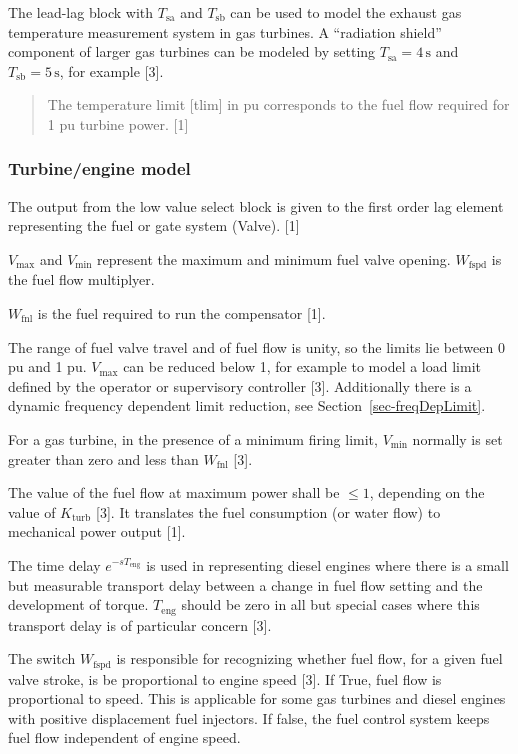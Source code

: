 \documentclass[
  a4paper,
  DIV=11,
  numbers=noendperiod]{scrartcl}
\begin{document}
The lead-lag block with \(T_\mathrm{sa}\) and \(T_\mathrm{sb}\) can be
used to model the exhaust gas temperature measurement system in gas
turbines. A ``radiation shield'' component of larger gas turbines can be
modeled by setting \(T_\mathrm{sa}=4\,\mathrm{s}\) and
\(T_\mathrm{sb}=5\,\mathrm{s}\), for example {[}3{]}.

\begin{quote}
The temperature limit {[}tlim{]} in pu corresponds to the fuel flow
required for 1 pu turbine power. {[}1{]}
\end{quote}

\subsubsection{Turbine/engine model}\label{turbineengine-model}

The output from the low value select block is given to the first order
lag element representing the fuel or gate system (Valve). {[}1{]}

\(V_\mathrm{max}\) and \(V_\mathrm{min}\) represent the maximum and
minimum fuel valve opening. \(W_\mathrm{fspd}\) is the fuel flow
multiplyer.

\(W_\mathrm{fnl}\) is the fuel required to run the compensator {[}1{]}.

The range of fuel valve travel and of fuel flow is unity, so the limits
lie between 0 pu and 1 pu. \(V_\mathrm{max}\) can be reduced below 1,
for example to model a load limit defined by the operator or supervisory
controller {[}3{]}. Additionally there is a dynamic frequency dependent
limit reduction, see Section~\ref{sec-freqDepLimit}.

For a gas turbine, in the presence of a minimum firing limit,
\(V_\mathrm{min}\) normally is set greater than zero and less than
\(W_\mathrm{fnl}\) {[}3{]}.

The value of the fuel flow at maximum power shall be \(\leq 1\),
depending on the value of \(K_\mathrm{turb}\) {[}3{]}. It translates the
fuel consumption (or water flow) to mechanical power output {[}1{]}.

The time delay \(e^{-sT_\mathrm{eng}}\) is used in representing diesel
engines where there is a small but measurable transport delay between a
change in fuel flow setting and the development of torque.
\(T_\mathrm{eng}\) should be zero in all but special cases where this
transport delay is of particular concern {[}3{]}.

The switch \(W_\mathrm{fspd}\) is responsible for recognizing whether
fuel flow, for a given fuel valve stroke, is be proportional to engine
speed {[}3{]}. If True, fuel flow is proportional to speed. This is
applicable for some gas turbines and diesel engines with positive
displacement fuel injectors. If false, the fuel control system keeps
fuel flow independent of engine speed.
\end{document}
